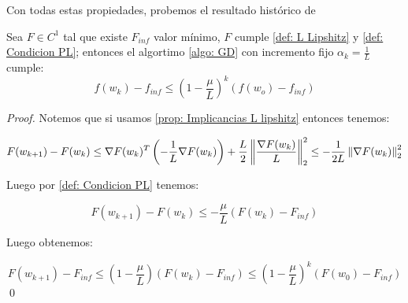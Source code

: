 Con todas estas propiedades, probemos el resultado hist\'orico de  \cite{polyak:1963}

\begin{theorem}
	\label{theorem: convergencia lineal GD}
	Sea $F \in C^1$ tal que existe $F_{inf}$ valor m\'inimo, $F$ cumple \ref{def: L Lipshitz} y \ref{def: Condicion PL}; entonces el algortimo \ref{algo: GD} con incremento fijo $\alpha_k = \frac{1}{L}$ cumple:
	\begin{equation}
	f(w_k) - f_{inf} \leq \left(1 - \frac{\mu}{L}\right)^k \left(f(w_o) - f_{inf}\right)
	\end{equation}
\end{theorem}

\begin{proof}
	Notemos que si usamos \ref{prop: Implicancias L lipshitz} entonces tenemos:
	
	\begin{equation*}
		F(w_{k+1}) - F(w_k) \leq \nabla F(w_k)^T \left(-\frac{1}{L} \nabla F(w_k)\right) + \frac{L}{2} \left\lVert\frac{\nabla F(w_k)}{L}\right\rVert_2^2 \leq -\frac{1}{2L} \left\lVert\nabla F(w_k)\right\rVert_2^2
	\end{equation*}
	
	Luego por \ref{def: Condicion PL} tenemos:
	
	\begin{equation*}
		F(w_{k+1}) - F(w_k) \leq - \frac{\mu}{L} \left(F(w_k) - F_{inf}\right)
	\end{equation*}
	
	Luego obtenemos:
	
	\begin{equation*}
	F(w_{k+1}) - F_{inf} \leq \left(1 - \frac{\mu}{L} \right) \left(F(w_k) - F_{inf}\right) \leq \left(1 - \frac{\mu}{L}\right)^k \left(F(w_0) - F_{inf}\right)
	\end{equation*}\qed
	
	
\end{proof}
